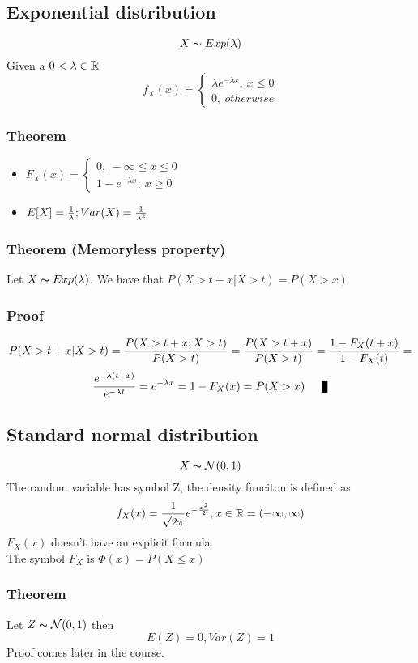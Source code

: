 \documentclass{article}
\newcommand{\N}{{\mathcal{N}}}
\begin{document}
\subsection{Exponential distribution}
$$ X\thicksim Exp(\lambda) $$
Given a $0 < \lambda \in {\mathbb R}$
$$ f_X(x) = \begin{cases}
  \lambda e^{-\lambda x},\ x\le 0\\
  0,\ otherwise
\end{cases} $$

\subsubsection{Theorem}
\begin{itemize}
    \item $ F_X(x) = \begin{cases} 
      0,\ -\infty\le x\le 0\\
      1-e^{-\lambda x},\ x\ge 0
    \end{cases} $
  \item $ E[X] = \frac{1}{\lambda}; Var(X) = \frac{1}{\lambda^2}$
\end{itemize}

\subsubsection{Theorem (Memoryless property)}
Let $X\thicksim Exp(\lambda)$. We have that $P(X>t+x | X>t) = P(X>x)$
\subsubsection{Proof}
$$P(X>t+x | X>t) = \frac{P(X>t+x ; X>t)}{P(X>t)} = \frac{P(X>t+x)}{P(X>t)} = \frac{1-F_X(t+x)}{1-F_X(t)} =$$
$$\f{e^{-\lambda (t+x)}}{e^{-\lambda t}} = e^{-\lambda x} = 1-F_X(x) = P(X>x) \qed$$

\subsection{Standard normal distribution}
$$ X\thicksim \N(0, 1) $$
The random variable has symbol Z, the density funciton is defined as 
$$ f_X(x) = \frac{1}{\sqrt{2\pi}}e^{-\frac{x^2}{2}}, x\in {\mathbb R} = (-\infty, \infty) $$
$F_X(x)$ doesn't have an explicit formula.\\
The symbol $F_X$ is $\Phi(x) = P(X\le x)$

\subsubsection{Theorem}
Let $ Z\thicksim \N(0, 1) $ then
$$ E(Z) = 0, Var(Z)=1 $$
Proof comes later in the course.
\end{document}
